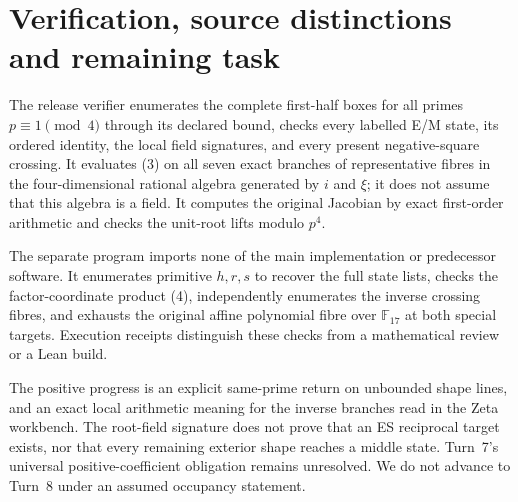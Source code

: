 \section{Verification, source distinctions and remaining task}
The release verifier enumerates the complete first-half boxes for all primes
$p\equiv1\pmod4$ through its declared bound, checks every labelled E/M state,
its ordered identity, the local field signatures, and every present negative-square
crossing. It evaluates (3) on all seven exact branches of representative fibres
in the four-dimensional rational algebra generated by $i$ and $\xi$; it does not
assume that this algebra is a field. It computes the original Jacobian by exact
first-order arithmetic and checks the unit-root lifts modulo $p^4$.

The separate program imports none of the main implementation or predecessor
software. It enumerates primitive $h,r,s$ to recover the full state lists,
checks the factor-coordinate product (4), independently enumerates the inverse
crossing fibres, and exhausts the original affine polynomial fibre over
$\mathbb F_{17}$ at both special targets. Execution receipts distinguish these
checks from a mathematical review or a Lean build.

The positive progress is an explicit same-prime return on unbounded shape lines,
and an exact local arithmetic meaning for the inverse branches read in the Zeta
workbench. The root-field signature does not prove that an ES reciprocal target
exists, nor that every remaining exterior shape reaches a middle state.
Turn~7's universal positive-coefficient obligation remains unresolved. We do not
advance to Turn~8 under an assumed occupancy statement.
